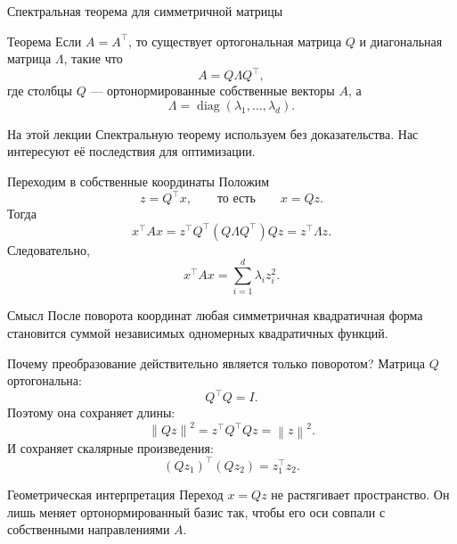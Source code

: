 \documentclass[aspectratio=169,10pt]{beamer}
\newcommand{\norm}[1]{\left\lVert #1\right\rVert}
\begin{document}
\begin{frame}{Спектральная теорема для симметричной матрицы}
\small
\begin{block}{Теорема}
Если $A=A^\top$, то существует ортогональная матрица $Q$ и диагональная матрица $\Lambda$, такие что
\[
 \boxed{A=Q\Lambda Q^\top,}
\]
где столбцы $Q$ --- ортонормированные собственные векторы $A$, а
\[
 \Lambda=\operatorname{diag}(\lambda_1,\ldots,\lambda_d).
\]
\end{block}

\begin{alertblock}{На этой лекции}
Спектральную теорему используем без доказательства. Нас интересуют её последствия для оптимизации.
\end{alertblock}
\end{frame}

\begin{frame}{Переходим в собственные координаты}
\small
Положим
\[
 z=Q^\top x,
 \qquad\text{то есть}\qquad
 x=Qz.
\]
Тогда
\[
 x^\top Ax
 =z^\top Q^\top(Q\Lambda Q^\top)Qz
 =z^\top\Lambda z.
\]
Следовательно,
\[
 \boxed{
 x^\top Ax=\sum_{i=1}^{d}\lambda_i z_i^2.
 }
\]

\begin{block}{Смысл}
После поворота координат любая симметричная квадратичная форма становится суммой независимых одномерных квадратичных функций.
\end{block}
\end{frame}

\begin{frame}{Почему преобразование действительно является только поворотом?}
\small
Матрица $Q$ ортогональна:
\[
 Q^\top Q=I.
\]
Поэтому она сохраняет длины:
\[
 \norm{Qz}^2=z^\top Q^\top Qz=\norm{z}^2.
\]
И сохраняет скалярные произведения:
\[
 (Qz_1)^\top(Qz_2)=z_1^\top z_2.
\]

\begin{alertblock}{Геометрическая интерпретация}
Переход $x=Qz$ не растягивает пространство. Он лишь меняет ортонормированный базис так, чтобы его оси совпали с собственными направлениями $A$.
\end{alertblock}
\end{frame}
\end{document}
